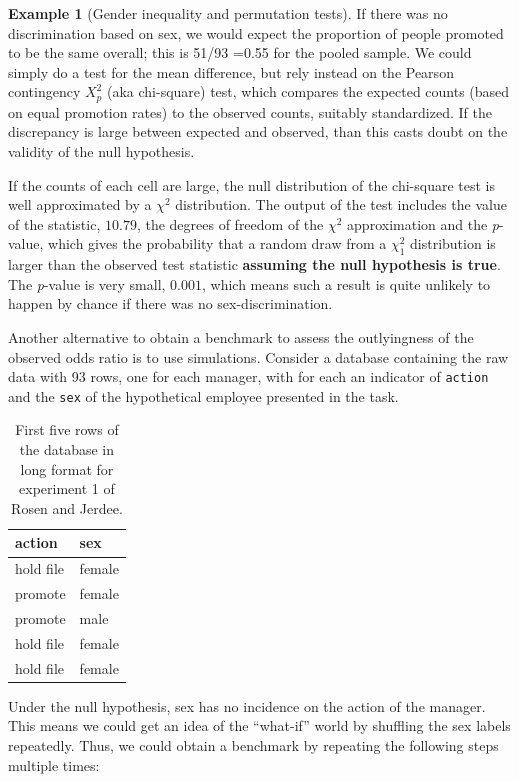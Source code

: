 \documentclass[
  11pt,
  letterpaper,
]{scrbook}
\theoremstyle{definition}
\newtheorem{example}{Example}[chapter]
\theoremstyle{remark}
\begin{document}
\begin{example}[Gender inequality and permutation
tests]
If there was no discrimination based on sex, we would expect the
proportion of people promoted to be the same overall; this is 51/93
=0.55 for the pooled sample. We could simply do a test for the mean
difference, but rely instead on the Pearson contingency \(X^2_p\) (aka
chi-square) test, which compares the expected counts (based on equal
promotion rates) to the observed counts, suitably standardized. If the
discrepancy is large between expected and observed, than this casts
doubt on the validity of the null hypothesis.

If the counts of each cell are large, the null distribution of the
chi-square test is well approximated by a \(\chi^2\) distribution. The
output of the test includes the value of the statistic, \(10.79\), the
degrees of freedom of the \(\chi^2\) approximation and the
\emph{p}-value, which gives the probability that a random draw from a
\(\chi^2_1\) distribution is larger than the observed test statistic
\textbf{assuming the null hypothesis is true}. The \emph{p}-value is
very small, \(0.001\), which means such a result is quite unlikely to
happen by chance if there was no sex-discrimination.

Another alternative to obtain a benchmark to assess the outlyingness of
the observed odds ratio is to use simulations. Consider a database
containing the raw data with 93 rows, one for each manager, with for
each an indicator of \texttt{action} and the \texttt{sex} of the
hypothetical employee presented in the task.

\hypertarget{tbl-dat-long-test-rosen-print}{}
\begin{table}
\caption{\label{tbl-dat-long-test-rosen-print}First five rows of the database in long format for experiment 1 of Rosen
and Jerdee. }\tabularnewline

\centering
\begin{tabular}{ll}
\toprule
action & sex\\
\midrule
hold file & female\\
promote & female\\
promote & male\\
hold file & female\\
hold file & female\\
\bottomrule
\end{tabular}
\end{table}

Under the null hypothesis, sex has no incidence on the action of the
manager. This means we could get an idea of the ``what-if'' world by
shuffling the sex labels repeatedly. Thus, we could obtain a benchmark
by repeating the following steps multiple times:


\end{example}
\end{document}
